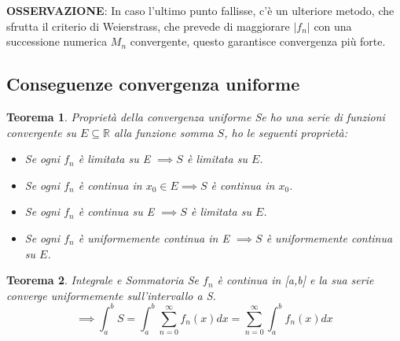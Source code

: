 \documentclass[a4paper]{article}
\newcommand{\numberset}{\mathbb}
\newcommand{\R}{\numberset{R}}
\theoremstyle{plain}
\newtheorem{Teo}{Teorema}
\begin{document}
\textbf{OSSERVAZIONE}: In caso l'ultimo punto fallisse, c'è un ulteriore metodo, che sfrutta il criterio
di Weierstrass, che prevede di maggiorare $|f_n|$ con una successione numerica $M_n$ convergente, questo garantisce 
convergenza più forte.

\subsection{Conseguenze convergenza uniforme}
\begin{Teo}{Proprietà della convergenza uniforme}
    Se ho una serie di funzioni convergente su $E\subseteq\R$ alla funzione somma $S$, 
    ho le seguenti proprietà:
    \begin{itemize}
        \item Se ogni $f_n$ è limitata su E $\implies S$ è limitata su $E$.
        \item Se ogni $f_n$ è continua in $x_0\in E\implies S$ è continua in $x_0$.
        \item Se ogni $f_n$ è continua su E $\implies S$ è limitata su $E$.
        \item Se ogni $f_n$ è uniformemente continua in E $\implies S$ è uniformemente continua su $E$.
    \end{itemize}
\end{Teo}
\begin{Teo}{Integrale e Sommatoria}
    Se $f_n$ è continua in [a,b] e la sua serie converge uniformemente sull'intervallo a S.
    $$\implies \int_a^b{S }=\int_a^b{\sum_{n=0}^\infty{f_n(x)}dx}=\sum_{n=0}^\infty{\int_a^b{f_n(x)dx}}$$
\end{Teo}
\end{document}

